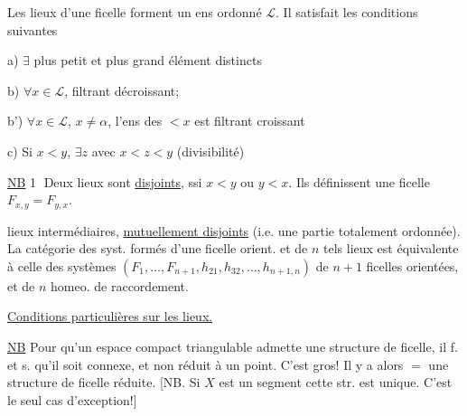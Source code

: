 
Les lieux d'une ficelle  forment un ens ordonné $\mathcal L$. Il satisfait les conditions suivantes

a) $\exists$ plus petit et plus grand élément  distincts

b) $\forall x\in\mathcal L$,   filtrant décroissant;

b') $\forall x\in\mathcal L$, $x\ne\alpha$, l'ens des  $<x$ est filtrant croissant

c) Si $x<y$, $\exists z$ avec $x<z<y$ (divisibilité)

\uline{NB} \textcircled{1} Deux lieux  sont \uline{disjoints},  ssi $x<y$ ou $y<x$. Ils définissent une ficelle $F_{x,y}=F_{y,x}$.


 lieux intermédiaires, \uline{mutuellement disjoints} (i.e.  une partie totalement ordonnée). La catégorie des syst. formés d'une ficelle orient.  et de $n$ tels lieux  est équivalente à celle des systèmes $(F_1,\ldots,F_{n+1},h_{21},h_{32},\ldots,h_{n+1,n})$ de $n+1$ ficelles orientées, et de $n$ homeo. de raccordement.



\uline{Conditions particulières sur les lieux.}

\uline{NB} Pour qu'un espace compact triangulable admette une structure de ficelle, il f. et s. qu'il soit connexe, et non réduit à un point. C'est gros! Il y a alors $=$ une structure de ficelle réduite. [NB. Si $X$ est un segment cette str. est unique. C'est le seul cas d'exception!]


